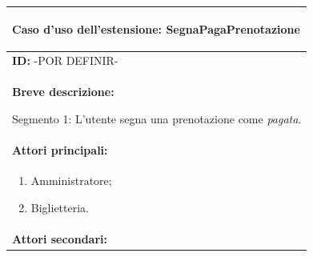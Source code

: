 \documentclass{article}
\begin{document}
                \begin{table}[t]
                    \centering
                    \begin{tabular}{|p{\linewidth}|}
                        \hline
                        \cellcolor{gray!100}
                        \color{white}
                        \begin{center}
                            \textbf{Caso d'uso dell'estensione:} SegnaPagaPrenotazione
                        \end{center} \\
                        \hline
                        \textbf{ID:} -POR DEFINIR- \\
                        \hline
                        \cellcolor{gray!20}
                        \textbf{Breve descrizione:}
                        
                        Segmento 1: L'utente segna una prenotazione come \emph{pagata}. \\
                        \hline
                        \textbf{Attori principali:} \\
                        \begin{minipage}{\linewidth}
                            \begin{enumerate}[noitemsep]
                                \item Amministratore;
                                \item Biglietteria.
                            \end{enumerate}
                        \end{minipage}
                        \vspace{-5pt} \\
                        \hline
                        \textbf{Attori secondari:}
                        

\end{tabular}
\end{table}
\end{document}
